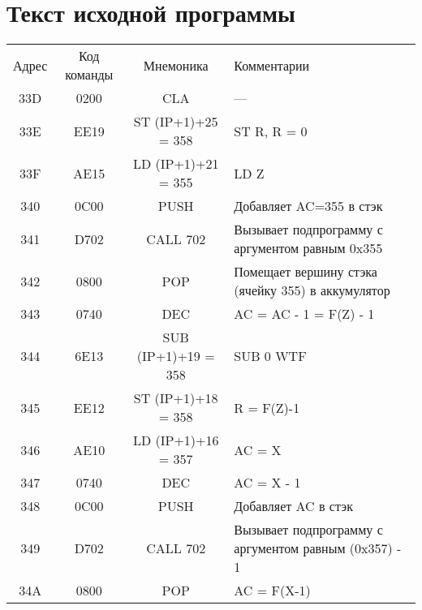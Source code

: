 \section{Текст исходной программы}
\begin{table}[h!]
    \centering
    \begin{longtable}{| c | c | c | p{9.5cm} |}
        \hline
        \small
        Адрес & Код команды & Мнемоника           & Комментарии                                           \\
        33D   & 0200        & CLA                 & ---                                                   \\
        33E   & EE19        & ST (IP+1)+25 = 358  & ST R, R = 0                                             \\
        33F   & AE15        & LD (IP+1)+21 = 355  & LD Z                                                   \\
        340   & 0C00        & PUSH                & Добавляет AC=355 в стэк                               \\
        341   & D702        & CALL 702            & Вызывает подпрограмму с аргументом равным 0x355       \\
        342   & 0800        & POP                 & Помещает вершину стэка (ячейку 355) в аккумулятор     \\
        343   & 0740        & DEC                 & AC = AC - 1 = F(Z) - 1                                          \\ 
        344   & 6E13        & SUB (IP+1)+19 = 358 & SUB 0 WTF                                             \\
        345   & EE12        & ST (IP+1)+18 = 358  & R = F(Z)-1                                            \\
        346   & AE10        & LD (IP+1)+16 = 357  & AC = X                                            \\
        347   & 0740        & DEC                 & AC = X - 1                                      \\
        348   & 0C00        & PUSH                & Добавляет AC в стэк                                   \\
        349   & D702        & CALL 702            & Вызывает подпрограмму с аргументом равным (0x357) - 1 \\
        34A   & 0800        & POP                 & AC = F(X-1)                                                   \\

\end{longtable}
\end{table}
